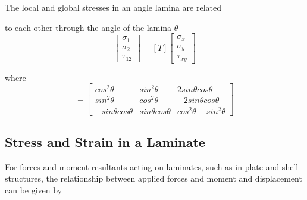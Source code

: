 The local and global stresses in an angle lamina are related

to each other through the angle of the lamina $\theta $
\begin{equation}\left[\begin{array}{l}\sigma _{1} \\ \sigma _{2} \\ \tau_{12}\end{array}\right]=[T]\left[\begin{array}{l}\sigma _{x} \\ \sigma _{y} \\\tau_{xy}\end{array}\right]
\end{equation}

where
\begin{equation}
	[T]=\left[\begin{array}{ccc}cos^{2}\theta & sin^{2}\theta & 2
		sin\theta cos\theta \\ 
sin^{2}\theta & cos^{2}\theta & -2 sin\theta cos\theta \\
-sin\theta cos\theta
			  & sin\theta cos\theta  &cos^{2}\theta -sin^{2}\theta
\end{array}\right] 
\end{equation}



\subsection{Stress and Strain in a Laminate}
For forces and moment resultants acting on laminates, such as in plate and shell
structures, the relationship between applied forces and moment and displacement
can be given by

